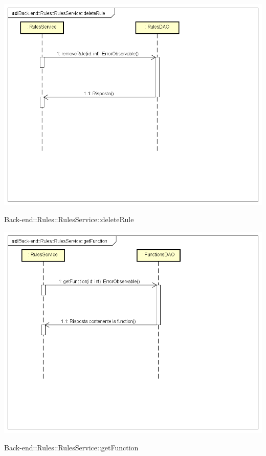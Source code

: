 \includegraphics[width=\textwidth,height=\textheight,keepaspectratio]{images/diagrams/back-end/Ufficial_Backend/Back-end__Rules__RulesService__deleteRule.png} 	\caption{Back-end::Rules::RulesService::deleteRule}
\includegraphics[width=\textwidth,height=\textheight,keepaspectratio]{images/diagrams/back-end/Ufficial_Backend/Back-end__Rules__RulesService__getFunction.png} 	\caption{Back-end::Rules::RulesService::getFunction}

